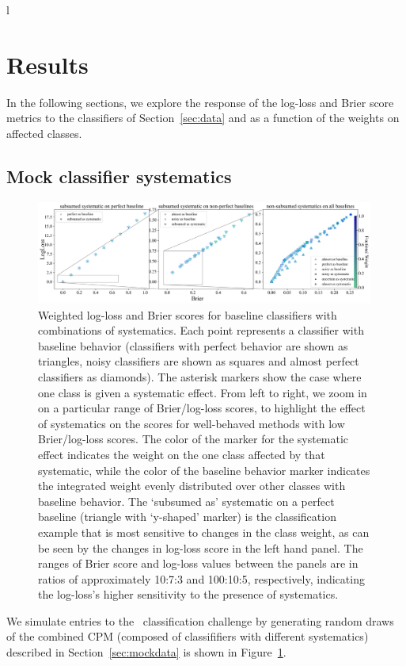 l\section{Results}
\label{sec:results}

In the following sections, we explore the response of the log-loss and Brier score metrics to the classifiers of Section~\ref{sec:data} and as a function of the weights on affected classes.

\subsection{Mock classifier systematics}
\label{sec:mockresults}

\begin{figure}
	\begin{center}
		\includegraphics[width=0.99\textwidth]{./fig/multipanel_res.png}
		\caption{Weighted log-loss and Brier scores for baseline classifiers with combinations of systematics.
		Each point represents a classifier with baseline behavior (classifiers with perfect behavior are shown as triangles, noisy classifiers are shown as squares and almost perfect classifiers as diamonds). The asterisk markers show the case where one class is given a systematic effect. From left to right, we zoom in on a particular range of Brier/log-loss scores, to highlight the effect of systematics on the scores for well-behaved methods with low Brier/log-loss scores. 
		The color of the marker for the systematic effect indicates the weight on the one class affected by that systematic, while the color of the baseline behavior marker indicates the integrated weight evenly distributed over other classes with baseline behavior. The `subsumed as' systematic on a perfect baseline (triangle with `y-shaped' marker) is the classification example that is most sensitive to changes in the class weight, as can be seen by the changes in log-loss score in the left hand panel.
		The ranges of Brier score and log-loss values between the panels are in ratios of approximately 10:7:3 and 100:10:5, respectively, indicating the log-loss's higher sensitivity to the presence of systematics.
		}
	\end{center}
	\label{fig:all_combined}
\end{figure}
We simulate entries to the \plasticc\ classification challenge by generating random draws of the combined CPM (composed of classififiers with different systematics) described in Section~\ref{sec:mockdata} is shown in Figure~\ref{fig:all_combined}.

